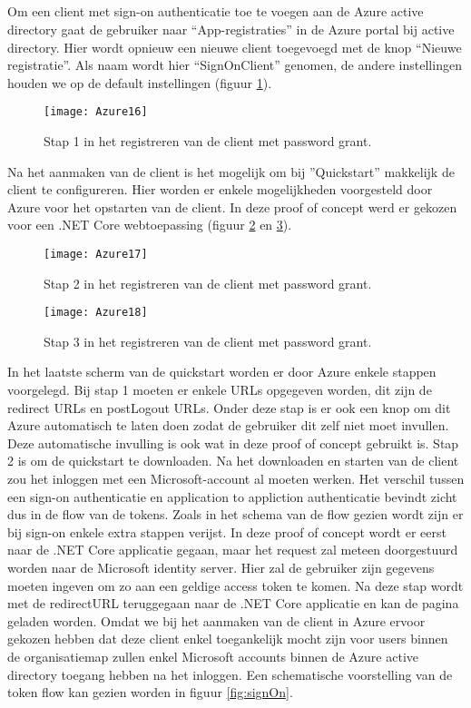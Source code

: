 \subsection{}
Om een client met sign-on authenticatie toe te voegen aan de Azure active directory gaat de gebruiker naar “App-registraties” in de Azure portal bij active directory. Hier wordt opnieuw een nieuwe client toegevoegd met de knop “Nieuwe registratie”. Als naam wordt hier “SignOnClient” genomen, de andere instellingen houden we op de default instellingen (figuur \ref{fig:azure16}). 
\begin{figure}[H]
	\centering
	\texttt{[image: Azure16]} 
	\caption[Azure16]{Stap 1 in het registreren van de client met password grant.}
	\label{fig:azure16}
\end{figure}
Na het aanmaken van de client is het mogelijk om bij ”Quickstart” makkelijk de client te configureren. Hier worden er enkele mogelijkheden voorgesteld door Azure voor het opstarten van de client. In deze proof of concept werd er gekozen voor een .NET Core webtoepassing (figuur \ref{fig:azure17} en \ref{fig:azure18}).
\begin{figure}[H]
	\centering
	\texttt{[image: Azure17]} 
	\caption[Azure17]{Stap 2 in het registreren van de client met password grant.}
	\label{fig:azure17}
\end{figure}\newpage
\begin{figure}[H]
	\centering
	\texttt{[image: Azure18]} 
	\caption[Azure18]{Stap 3 in het registreren van de client met password grant.}
	\label{fig:azure18}
\end{figure}
In het laatste scherm van de quickstart worden er door Azure enkele stappen voorgelegd. Bij stap 1 moeten er enkele URLs opgegeven worden, dit zijn de redirect URLs en postLogout URLs. Onder deze stap is er ook een knop om dit Azure automatisch te laten doen zodat de gebruiker dit zelf niet moet invullen. Deze automatische invulling is ook wat in deze proof of concept gebruikt is. Stap 2 is om de quickstart te downloaden. Na het downloaden en starten van de client zou het inloggen met een Microsoft-account al moeten werken.\newline
Het verschil tussen een sign-on authenticatie en application to appliction authenticatie bevindt zicht dus in de flow van de tokens. Zoals in het schema van de flow gezien wordt zijn er bij sign-on enkele extra stappen verijst. In deze proof of concept wordt er eerst naar de .NET Core applicatie gegaan, maar het request zal meteen doorgestuurd worden naar de Microsoft identity server. Hier zal de gebruiker zijn gegevens moeten ingeven om zo aan een geldige access token te komen. Na deze stap wordt met de redirectURL teruggegaan naar de .NET Core applicatie en kan de pagina geladen worden. Omdat we bij het aanmaken van de client in Azure ervoor gekozen hebben dat deze client enkel toegankelijk mocht zijn voor users binnen de organisatiemap zullen enkel Microsoft accounts binnen de Azure active directory toegang hebben na het inloggen. Een schematische voorstelling van de token flow kan gezien worden in figuur \ref{fig:signOn}. 
